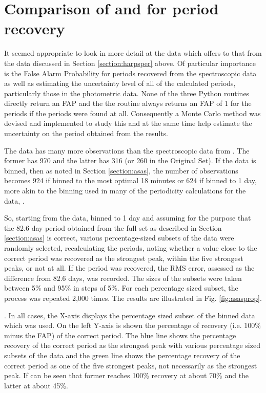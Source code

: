 \section{Comparison of {\asas} and {\harps} for period recovery}
\protect\label{section:asasfap}

It seemed appropriate to look in more detail at the {\asas} data which offers  to that from the {\harps} data discussed in Section \ref{section:harpsper}
above. Of particular importance is the False Alarm Probability for periods recovered from the spectroscopic data as well
as estimating the uncertainty level of all of the calculated periods, particularly those in the photometric data. None
of the three Python routines directly return an FAP and the the {\numrecs} routine always returns an FAP of 1 for the
periods if the periods were found at all. Consequently a Monte Carlo method was devised and implemented to study this
and at the same time help estimate the uncertainty on the period obtained from the {\asas} results.

The {\asas} data has many more observations than the spectroscopic data from {\harps}. The former has 970 and the latter
has 316 (or 260 in the Original Set). If the {\asas} data is binned, then as noted in Section \ref{section:asas}, the
number of observations becomes 924 if binned to the most optimal 18 minutes or 624 if binned to 1 day, more akin to the
binning used in many of the periodicity calculations for the {\harps} data, .

So, starting from the {\asas} data, binned to 1 day and assuming for the purpose that the 82.6 day period obtained from
the full set as described in Section \ref{section:asas} is correct, various percentage-sized subsets of the data were
randomly selected, recalculating the periods, noting whether a value close to the correct period was recovered as the
strongest peak, within the five strongest peaks, or not at all. If the period was recovered, the RMS error, assessed as
the difference from 82.6 days, was recorded. The sizes of the subsets were taken between 5\% and 95\% in steps of
5\%. For each percentage sized subset, the process was repeated 2,000 times. The results are illustrated in
Fig. \ref{fig:asasprop}.

. In all cases, the X-axis displays the percentage sized
subset of the binned {\asas} data which was used. On the left Y-axis is shown the percentage of recovery (i.e. 100\%
minus the FAP) of the correct period. The blue line shows the percentage recovery of the correct period as the strongest
peak with various percentage sized subsets of the data and the green line shows the percentage recovery of the correct
period as one of the five strongest peaks, not necessarily as the strongest peak. If can be seen that 
former reaches 100\% recovery at about 70\% and the latter at about 45\%.

